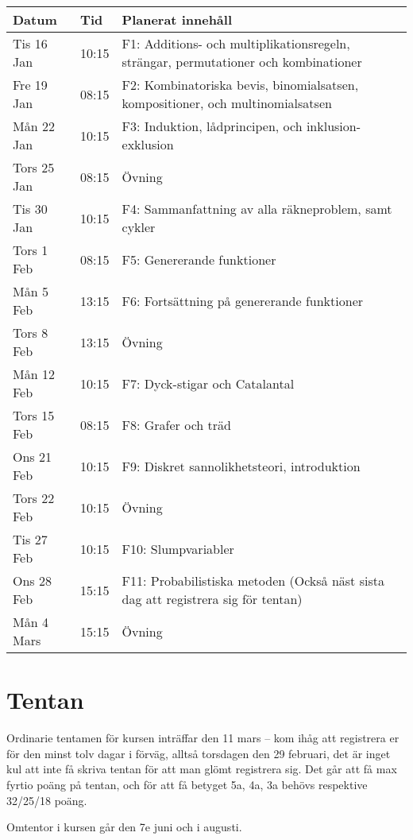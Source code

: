 \documentclass{tufte-handout}
\begin{document}
\begin{table}[h]
\begin{tabularx}{\textwidth}{llX}
Datum & Tid      & Planerat innehåll \\ 
\midrule
Tis 16 Jan &10:15 & F1: Additions- och multiplikationsregeln, strängar, permutationer och kombinationer\\
Fre 19 Jan &08:15 & F2: Kombinatoriska bevis, binomialsatsen, kompositioner, och multinomialsatsen\\
Mån 22 Jan &10:15 & F3: Induktion, lådprincipen, och inklusion-exklusion\\
Tors 25 Jan &08:15 & Övning\\
Tis 30 Jan &10:15 & F4: Sammanfattning av alla räkneproblem, samt cykler\\
Tors 1 Feb &08:15 & F5: Genererande funktioner\\
Mån 5 Feb &13:15 & F6: Fortsättning på genererande funktioner\\
Tors 8 Feb &13:15 & Övning\\
Mån 12 Feb &10:15 & F7: Dyck-stigar och Catalantal\\
Tors 15 Feb &08:15 & F8: Grafer och träd\\
Ons 21 Feb &10:15 & F9: Diskret sannolikhetsteori, introduktion\\
Tors 22 Feb &10:15 & Övning\\
Tis 27 Feb &10:15 & F10: Slumpvariabler\\
Ons 28 Feb &15:15 & F11: Probabilistiska metoden (Också näst sista dag att registrera sig för tentan)\\
Mån 4 Mars &15:15 & Övning
\end{tabularx}
\end{table}

\section{Tentan}

Ordinarie tentamen för kursen inträffar den 11 mars -- kom ihåg att registrera er för den minst tolv dagar i förväg, alltså torsdagen den 29 februari, det är inget kul att inte få skriva tentan för att man glömt registrera sig. Det går att få max fyrtio poäng på tentan, och för att få betyget 5a, 4a, 3a behövs respektive 32/25/18 poäng.

Omtentor i kursen går den 7e juni och i augusti.
\end{document}
